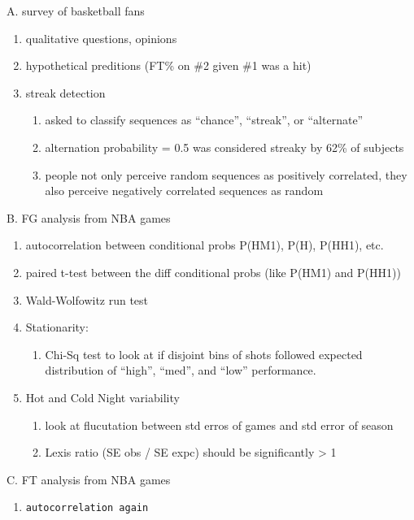 \documentclass[12pt,twoside]{dukestatscithesis}
\providecommand{\tightlist}{%
  \setlength{\itemsep}{0pt}\setlength{\parskip}{0pt}}
\theoremstyle{definition}
\theoremstyle{definition}
\theoremstyle{definition}
\theoremstyle{remark}
\begin{document}
A. survey of basketball fans
\begin{enumerate}
\def\labelenumi{\arabic{enumi}.}
\tightlist
\item
  qualitative questions, opinions
\item
  hypothetical preditions (FT\% on \#2 given \#1 was a hit)
\item
  streak detection
  \begin{enumerate}
  \def\labelenumii{\alph{enumii}.}
  \tightlist
  \item
    asked to classify sequences as ``chance'', ``streak'', or
    ``alternate''
  \item
    alternation probability = 0.5 was considered streaky by 62\% of
    subjects
  \item
    people not only perceive random sequences as positively correlated,
    they also perceive negatively correlated sequences as random
  \end{enumerate}
\end{enumerate}
B. FG analysis from NBA games
\begin{enumerate}
\def\labelenumi{\arabic{enumi}.}
\tightlist
\item
  autocorrelation between conditional probs P(H\textbar{}M1), P(H),
  P(H\textbar{}H1), etc.
\item
  paired t-test between the diff conditional probs (like
  P(H\textbar{}M1) and P(H\textbar{}H1))
\item
  Wald-Wolfowitz run test
\item
  Stationarity:
  \begin{enumerate}
  \def\labelenumii{\alph{enumii}.}
  \tightlist
  \item
    Chi-Sq test to look at if disjoint bins of shots followed expected
    distribution of ``high'', ``med'', and ``low'' performance.
  \end{enumerate}
\item
  Hot and Cold Night variability
  \begin{enumerate}
  \def\labelenumii{\alph{enumii}.}
  \tightlist
  \item
    look at flucutation between std erros of games and std error of
    season
  \item
    Lexis ratio (SE obs / SE expc) should be significantly
    \textgreater{} 1
  \end{enumerate}
\end{enumerate}
C. FT analysis from NBA games
\begin{enumerate}
\def\labelenumi{\arabic{enumi}.}
\item
\begin{verbatim}
autocorrelation again
\end{verbatim}
\end{enumerate}
\end{document}
